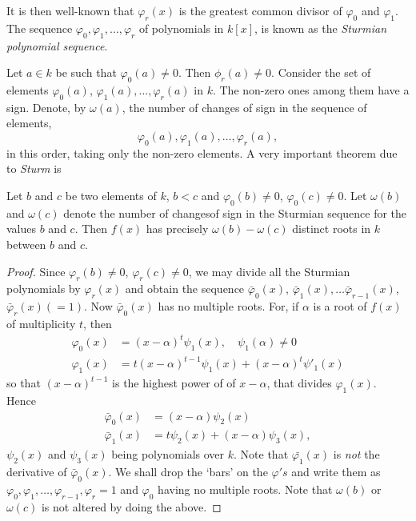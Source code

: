 It is then well-known that $\varphi_r (x)$ is the greatest common
divisor of $\varphi_0$ and $\varphi_1$. The sequence $\varphi_0,
\varphi_1, \ldots, \varphi_r$ of polynomials in $k[x]$, is known as
the \textit{Sturmian polynomial sequence}.

Let $a\in k$ be such that $\varphi_0 (a) \neq 0$. Then $\phi_r (a)
\neq 0$. Consider the set of elements $\varphi_0 (a)$, $\varphi_1 (a),
\ldots, \varphi_r(a)$ in $k$. The non-zero ones among them have a
sign. Denote, by $\omega(a)$, the number of changes of sign in the
sequence of elements,
$$
\varphi_0 (a), \varphi_1(a), \ldots, \varphi_r(a),
$$
in this order, taking only the non-zero elements. A very important
theorem due to \textit{Sturm} is

\begin{thm}%
Let $b$ and $c$ be two elements of $k$, $b<c$ and $\varphi_0 (b) \neq
0$, $\varphi_0 (c) \neq 0$. Let $\omega(b)$ and $\omega (c)$ denote
the number of changes\pageoriginale of sign in the Sturmian sequence
for the values $b$ and $c$. Then $f(x)$ has precisely $\omega(b) -
\omega(c)$ distinct roots in $k$ between $b$ and $c$. 
\end{thm}

\begin{proof}
Since $\varphi_r(b) \neq 0$, $\varphi_r(c) \neq 0$, we may divide all
the Sturmian polynomials by $\varphi_r(x)$ and obtain the sequence
$\bar{\varphi}_0 (x)$, $\bar{\varphi}_1(x), \ldots \bar{\varphi}_{r-1}
(x)$, $\bar{\varphi}_r (x) (=1)$. Now $\bar{\varphi}_0(x)$ has no
multiple roots. For, if $\alpha$ is a root of $f(x)$ of multiplicity
$t$, then 
\begin{align*}
\varphi_0 (x) & = (x-\alpha)^t \psi_1(x), \quad \psi_1(\alpha) \neq
0\\
\varphi_1 (x) & = t(x-\alpha)^{t-1}\psi_1(x) + (x-\alpha)^t \psi'_1(x)
\end{align*}
so that $(x-\alpha)^{t-1}$ is the highest power of of $x-\alpha$, that
divides $\varphi_1(x)$. Hence
\begin{align*}
\bar{\varphi}_0 (x) & = (x-\alpha) \psi_2(x)\\
\bar{\varphi}_1(x) & = t \psi_2(x) + (x-\alpha) \psi_3 (x),
\end{align*}
$\psi_2(x)$ and $\psi_3(x)$ being polynomials over $k$. Note that
$\bar{\varphi_1}(x)$  is \textit{not} the derivative of
$\bar{\varphi}_0(x)$. We shall drop the `bars' on the $\varphi's$ and
write them as $\varphi_0, \varphi_1, \ldots,\varphi_{r-1},
\varphi_r=1$ and $\varphi_0$ having no multiple roots. Note that
$\omega(b)$ or $\omega(c)$ is not altered by doing the above.
\end{proof}

